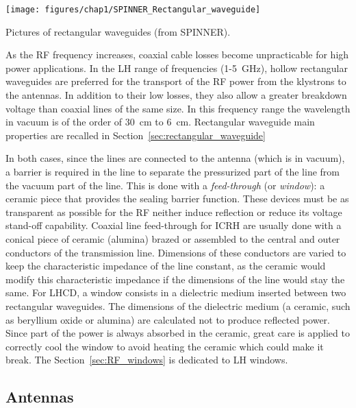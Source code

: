 \begin{marginfigure}
	\centering
	\texttt{[image: figures/chap1/SPINNER\_Rectangular\_waveguide]}
	\caption{Pictures of rectangular waveguides (from SPINNER).}
	\label{fig:spinnerrectangularwaveguide}
\end{marginfigure}

As the RF frequency increases, coaxial cable losses become unpracticable for high power applications. In the LH range of frequencies (1-5~\si{GHz}), hollow rectangular waveguides are preferred for the transport of the RF power from the klystrons to the antennas. In addition to their low losses, they also allow a greater breakdown voltage than coaxial lines of the same size. In this frequency range the wavelength in vacuum is of the order of 30~\si{cm} to 6~\si{cm}. Rectangular waveguide main properties are recalled in Section~\ref{sec:rectangular_waveguide}

In both cases, since the lines are connected to the antenna (which is in vacuum), a barrier is required in the line to separate the pressurized part of the line from the vacuum part of the line. This is done with a \textit{feed-through} (or \textit{window}): a ceramic piece that provides the sealing barrier function. These devices must be as transparent as possible for the RF neither induce reflection or reduce its voltage stand-off capability. Coaxial line feed-through for ICRH are usually done with a conical piece of ceramic (alumina) brazed or assembled to the central and outer conductors of the transmission line. Dimensions of these conductors are varied to keep the characteristic impedance of the line constant, as the ceramic would modify this characteristic impedance if the dimensions of the line would stay the same. For LHCD, a window consists in a dielectric medium inserted between two rectangular waveguides. The dimensions of the dielectric medium (a ceramic, such as beryllium oxide or alumina) are calculated not to produce reflected power. Since part of the power is always absorbed in the ceramic, great care is applied to correctly cool the window to avoid heating the ceramic which could make it break. The Section~\ref{sec:RF_windows} is dedicated to LH windows.


\subsection{Antennas}\label{sec:RF_antennas}

